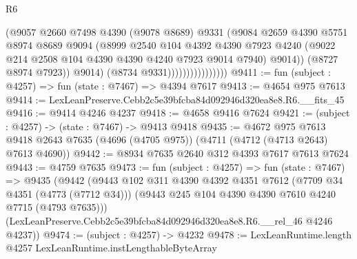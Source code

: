 \begin{lexlean}{R6}
\begin{coremodule}
                                    (@9057
                                      @2660
                                      @7498
                                      @4390
                                      (@9078 @8689)
                                      @9331
                                      (@9084
                                        @2659
                                        @4390
                                        @5751
                                        @8974
                                        @8689
                                        @9094
                                        (@8999
                                          @2540
                                          @104
                                          @4392
                                          @4390
                                          @7923
                                          @4240
                                          (@9022
                                            @214
                                            @2508
                                            @104
                                            @4390
                                            @4390
                                            @4240
                                            @7923
                                            @9014
                                            @7940)
                                          @9014))
                                      (@8727 @8974 @7923))
                                    @9014)
                                  (@8734 @9331))))))))))))))))
@9411 := fun (subject : @4257) => fun (state : @7467) => @4394 @7617
@9413 := @4654 @975 @7613
@9414 := LexLeanPreserve.Cebb2c5e39bfcba84d092946d320ea8e8.R6.__fits_45
@9416 := @9414 @4246 @4237
@9418 := @4658 @9416 @7624
@9421 := (subject : @4257) -> (state : @7467) -> @9413 @9418
@9435 := @4672
    @975
    @7613
    @9418
    @2643
    @7635
    (@4696 (@4705 @975))
    (@4711 (@4712 (@4713 @2643) @7613 @4690))
@9442 := @8934 @7635 @2640 @312 @4393 @7617 @7613 @7624
@9443 := @4759 @7635
@9473 := fun (subject : @4257) =>
  fun (state : @7467) =>
  @9435
    (@9442
      (@9443
        @102
        @311
        @4390
        @4392
        @4351
        @7612
        (@7709 @34 @4351 (@4773 (@7712 @34)))
        (@9443 @245 @104 @4390 @4390 @7610 @4240 @7715 (@4793 @7635)))
      (LexLeanPreserve.Cebb2c5e39bfcba84d092946d320ea8e8.R6.__rel_46 @4246 @4237))
@9474 := (subject : @4257) -> @4232
@9478 := LexLeanRuntime.length @4257 LexLeanRuntime.instLengthableByteArray

\end{coremodule}
\end{lexlean}
